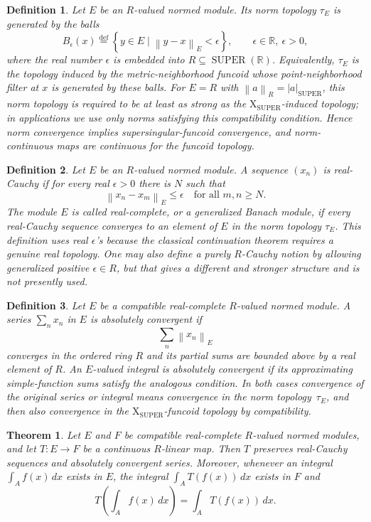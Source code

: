\documentclass{amsart}
\newtheorem{thm}{Theorem}
\newtheorem{defn}{Definition}
\newcommand{\setcond}[2]{\left\{ #1 \mid #2 \right\}}
\DeclareMathOperator{\SUPER}{SUPER}
\newcommand{\eqdef}{\overset{\mathrm{def}}{=}}
\newcommand{\norm}[1]{\left\lVert #1\right\rVert}
\newcommand{\abs}[1]{\left\lvert #1\right\rvert}
\begin{document}
\begin{defn}
Let $E$ be an $R$-valued normed module.  Its norm topology $\tau_E$ is generated
by the balls
\[
  B_\epsilon(x)\eqdef
  \setcond{y\in E}{\norm{y-x}_E<\epsilon},
  \qquad \epsilon\in\mathbb{R},\ \epsilon>0,
\]
where the real number $\epsilon$ is embedded into $R\subseteq\SUPER(\mathbb{R})$.
Equivalently, $\tau_E$ is the topology induced by the metric-neighborhood
funcoid whose point-neighborhood filter at $x$ is generated by these balls.
For $E=R$ with $\norm{a}_R=\abs{a}_{\SUPER}$, this norm topology is required to
be at least as strong as the $\mathrm{X}_{\SUPER}$-induced topology; in
applications we use only norms satisfying this compatibility condition.  Hence
norm convergence implies supersingular-funcoid convergence, and norm-continuous
maps are continuous for the funcoid topology.
\end{defn}

\begin{defn}
Let $E$ be an $R$-valued normed module.  A sequence $(x_n)$ is real-Cauchy if
for every real $\epsilon>0$ there is $N$ such that
\[
  \norm{x_n-x_m}_E\leq\epsilon
  \quad\text{for all }m,n\geq N.
\]
The module $E$ is called real-complete, or a generalized Banach module, if
every real-Cauchy sequence converges to an element of $E$ in the norm topology
$\tau_E$.  This definition uses real $\epsilon$'s because the classical
continuation theorem requires a genuine real topology.  One may also define a
purely $R$-Cauchy notion by allowing generalized positive $\epsilon\in R$, but
that gives a different and stronger structure and is not presently used.
\end{defn}

\begin{defn}
Let $E$ be a compatible real-complete $R$-valued normed module.  A series
$\sum_n x_n$ in $E$ is absolutely convergent if
\[
  \sum_n \norm{x_n}_E
\]
converges in the ordered ring $R$ and its partial sums are bounded above by a
real element of $R$.  An $E$-valued integral is absolutely convergent if its
approximating simple-function sums satisfy the analogous condition.  In both
cases convergence of the original series or integral means convergence in the
norm topology~$\tau_E$, and then also convergence in the
$\mathrm{X}_{\SUPER}$-funcoid topology by compatibility.
\end{defn}

\begin{thm}
Let $E$ and $F$ be compatible real-complete $R$-valued normed modules, and let
$T:E\to F$ be a continuous $R$-linear map.  Then $T$ preserves real-Cauchy
sequences and absolutely convergent series.  Moreover, whenever an integral
$\int_A f(x)\,dx$ exists in $E$, the integral $\int_A T(f(x))\,dx$ exists in
$F$ and
\[
  T\left(\int_A f(x)\,dx\right)=\int_A T(f(x))\,dx.
\]
\end{thm}
\end{document}
